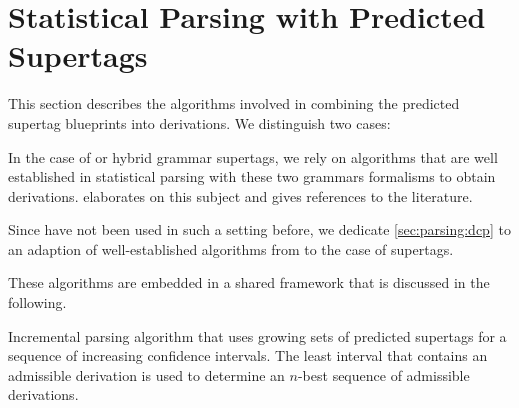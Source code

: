 \documentclass[../../document.tex]{subfiles}
\begin{document}
    \section{Statistical Parsing with Predicted Supertags}\label{sec:parsing}
    This section describes the algorithms involved in combining the predicted supertag blueprints into derivations.
    We distinguish two cases:
    \begin{inparaenum}[]
        \item In the case of  or hybrid grammar supertags, we rely on algorithms that are well established in statistical parsing with these two grammars formalisms to obtain derivations.  elaborates on this subject and gives references to the literature.
        \item Since  have not been used in such a setting before, we dedicate \cref{sec:parsing:dcp} to an adaption of well-established algorithms from  to the case of  supertags.
    \end{inparaenum}
    These algorithms are embedded in a shared framework that is discussed in the following.

    \begin{algorithm}[t]
        \caption{\label{alg:parsing:incremental}
            Incremental parsing algorithm that uses growing sets of predicted supertags for a sequence of increasing confidence intervals.
            The least interval that contains an admissible derivation is used to determine an \(n\)-best sequence of admissible derivations.
        }
        
    \end{algorithm}
\end{document}
